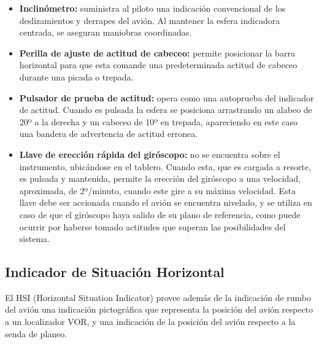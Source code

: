 \documentclass[a4paper,12pt,twoside]{article}
\begin{document}
\begin{itemize}
        \item {\bf Inclin\'ometro: }
	suministra al piloto una indicaci\'on convencional de los deslizamientos
	y derrapes del avi\'on. Al mantener la esfera indicadora centrada,
	se aseguran maniobras coordinadas.

        \item {\bf Perilla de ajuste de actitud de cabeceo: }
	permite posicionar la barra horizontal para que esta comande una
	predeterminada actitud de cabeceo durante una picada o trepada.

        \item {\bf Pulsador de prueba de actitud: }
	opera como una autoprueba del indicador de actitud. Cuando es pulsada
	la esfera se posiciona arrastrando un alabeo de 20º a la derecha
	y un cabeceo de 10º en trepada, apareciendo en este caso una bandera
	de advertencia de actitud erronea.

        \item {\bf Llave de erecci\'on r\'apida del gir\'oscopo: }
	no se encuentra sobre el instrumento, ubic\'andose en el tablero.
	Cuando esta, que es cargada a resorte, es pulsada y mantenida, 
	permite la erecci\'on del gir\'oscopo a una velocidad, aproximada,
	de 2º/minuto, cuando este gire a su m\'axima velocidad.
	Esta llave debe ser accionada cuando el avi\'on se encuentra
	nivelado, y se utiliza en caso de que el gir\'oscopo haya salido
	de su plano de referencia, como puede ocurrir por haberse tomado
	actitudes que superan las posibilidades del sistema.

\end{itemize}

\subsection{Indicador de Situaci\'on Horizontal}
\label{sec:indicador.situacion.horizontal}

El HSI (Horizontal Situation Indicator)
 provee adem\'as de la indicaci\'on de rumbo del avi\'on
una indicaci\'on pictogr\'afica que representa la posici\'on
del avi\'on respecto a un localizador VOR, y una indicaci\'on de la
posici\'on del avi\'on respecto a la senda de planeo.
\end{document}
